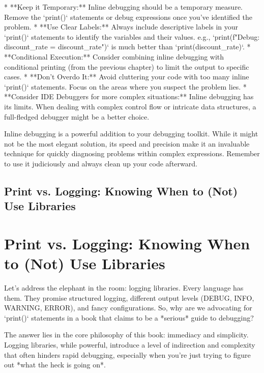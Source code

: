 \documentclass{article}
\begin{document}
*   **Keep it Temporary:** Inline debugging should be a temporary measure. Remove the `print()` statements or debug expressions once you've identified the problem.
*   **Use Clear Labels:**  Always include descriptive labels in your `print()` statements to identify the variables and their values.  e.g., `print(f"Debug: discount_rate = {discount_rate}")` is much better than `print(discount_rate)`.
*   **Conditional Execution:**  Consider combining inline debugging with conditional printing (from the previous chapter) to limit the output to specific cases.
*   **Don't Overdo It:**  Avoid cluttering your code with too many inline `print()` statements.  Focus on the areas where you suspect the problem lies.
*   **Consider IDE Debuggers for more complex situations:** Inline debugging has its limits. When dealing with complex control flow or intricate data structures, a full-fledged debugger might be a better choice.

Inline debugging is a powerful addition to your debugging toolkit. While it might not be the most elegant solution, its speed and precision make it an invaluable technique for quickly diagnosing problems within complex expressions. Remember to use it judiciously and always clean up your code afterward.

\newpage

\section*{Print vs. Logging: Knowing When to (Not) Use Libraries} %
\label{chapter-1-6-Print_vs._Logging__Knowing_When_to__Not}

\chapter{Print vs. Logging: Knowing When to (Not) Use Libraries}

Let's address the elephant in the room: logging libraries. Every language has them. They promise structured logging, different output levels (DEBUG, INFO, WARNING, ERROR), and fancy configurations. So, why are we advocating for `print()` statements in a book that claims to be a *serious* guide to debugging?

The answer lies in the core philosophy of this book: immediacy and simplicity. Logging libraries, while powerful, introduce a level of indirection and complexity that often hinders rapid debugging, especially when you're just trying to figure out *what the heck is going on*.
\end{document}
